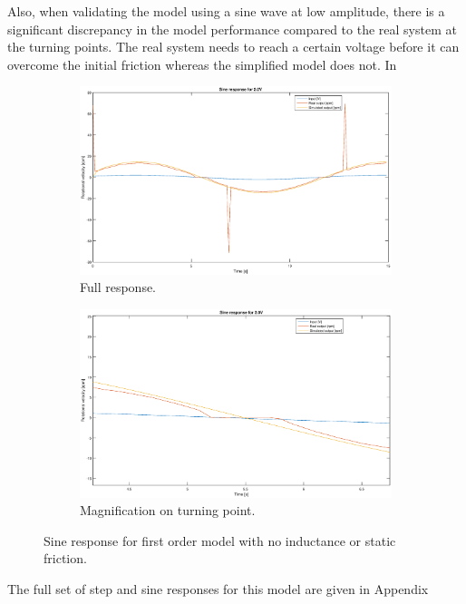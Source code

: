 Also, when validating the model using a sine wave at low amplitude, there is a
significant discrepancy in the model performance compared to the real system at
the turning points. The real system needs to reach a certain voltage before it
can overcome the initial friction whereas the simplified model does not. In 
\begin{figure}[H]
    \centering
    \begin{subfigure}[H]{0.48\textwidth}
    \label{fig:1storder_sine2}
    \includegraphics[width=\textwidth]{./img/testrig_2Vsine_no_i_no_fric.eps}
    \caption{Full response.}
    \end{subfigure}
    \begin{subfigure}[H]{0.48\textwidth}
    \label{fig:1storder_sine2z}
    \includegraphics[width=\textwidth]{./img/testrig_2Vsine_no_i_no_fric_zoom.eps}
    \caption{Magnification on turning point.}
    \end{subfigure}
    \caption{Sine response for first order model with no inductance or static
    friction.}
\end{figure}
The full set of step and sine responses for this model are given in Appendix %

